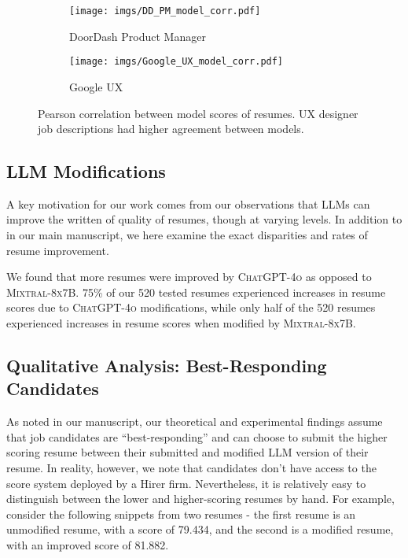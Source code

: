 \begin{figure*}
    \centering
    \begin{subfigure}{0.45\textwidth}
        \centering
        \texttt{[image: imgs/DD\_PM\_model\_corr.pdf]}
        \caption{DoorDash Product Manager}
    \end{subfigure}%
    \begin{subfigure}{0.45\textwidth}
        \centering
        \texttt{[image: imgs/Google\_UX\_model\_corr.pdf]}
        \caption{Google UX}
    \end{subfigure}

    \caption{Pearson correlation between model scores of resumes. UX designer job descriptions had higher agreement between models.}
    \label{fig:corr}
\end{figure*}

\subsection{LLM Modifications}
    A key motivation for our work comes from our observations that LLMs can improve the written of quality of resumes, though at varying levels. In addition to  in our main manuscript, we here examine the exact disparities and rates of resume improvement.
    
    We found that more resumes were improved by \textsc{ChatGPT-4o} as opposed to \textsc{Mixtral-8x7B}. 75\% of our 520 tested resumes experienced increases in resume scores due to \textsc{ChatGPT-4o} modifications, while only half of the 520 resumes experienced increases in resume scores when modified by \textsc{Mixtral-8x7B}. %

    \subsection{Qualitative Analysis: Best-Responding Candidates}
    \label{app:best-responding candidates}
    
    As noted in our manuscript, our theoretical and experimental findings assume that job candidates are “best-responding” and can choose to submit the higher scoring resume between their submitted and modified LLM version of their resume. In reality, however, we note that candidates don’t have access to the score system deployed by a Hirer firm. Nevertheless, it is relatively easy to distinguish between the lower and higher-scoring resumes by hand. For example, consider the following snippets from two resumes - the first resume is an unmodified resume, with a score of 79.434, and the second is a modified resume, with an improved score of 81.882. 
    
